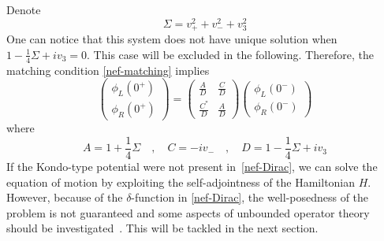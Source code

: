 Denote 
\begin{equation*}
\Sigma = v_+ ^ 2 + v_- ^ 2 + v_3 ^ 2
\end{equation*}
One can notice that this system does not have unique solution when $1 - \frac{1}{4}\Sigma + iv_3 = 0$. This case will be excluded in the following.
Therefore, the matching condition \cref{nef-matching} implies 
\begin{equation}\label{nef-matching2}
\begin{pmatrix}
\phi_L(0^+) \\
\phi_R(0^+)
\end{pmatrix} = \begin{pmatrix}
\frac{A}{D}  & \frac{C}{D} \\
\frac{C^*}{D} & \frac{A}{D}
\end{pmatrix}\begin{pmatrix}
\phi_L(0^-) \\
\phi_R(0^-)
\end{pmatrix}
\end{equation}
where 
\begin{equation*}
A = 1+ \frac{1}{4}\Sigma \quad, \quad
C = -iv_-  \quad, \quad
D = 1-\frac{1}{4}\Sigma + iv_3
\end{equation*}
%
If the Kondo-type potential were not present in~\cref{nef-Dirac}, 
we can solve the equation of motion by exploiting the self-adjointness of the Hamiltonian $H$.
However, because of the $\delta$-function in \cref{nef-Dirac}, 
the well-posedness of the problem is not guaranteed and some aspects of unbounded operator theory should be investigated~\cite{Reed1981}.
This will be tackled in the next section.
%



%
%
%
%


















